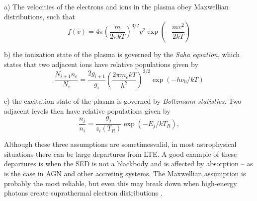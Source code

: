 a) The velocities of the electrons and ions in the plasma obey Maxwellian
distributions, such that
\begin{equation}
f(v) = 4 \pi \left( \frac{m}{2 \pi kT} \right)^{3/2} v^2 
\exp \left( - \frac{mv^2}{2kT} \right)
\label{eq:maxwellian}
\end{equation}

\smallskip

b) the ionization state of the plasma is governed by the {\em Saha equation},
which states that two adjacent ions have relative populations given by
\begin{equation}
\frac{N_{i+1}n_e}{N_i} = \frac{2g_{i+1}}{g_i} 
\left( \frac{2 \pi m_e kT}{h^2} \right)^{3/2}
\exp(-h \nu_0/kT)
\label{eq:saha}
\end{equation}

\smallskip

c) the excitation state of the plasma is governed by {\em Boltzmann statistics}.
Two adjacent levels then have relative populations given by
\begin{equation}
\frac{n_{j}}{n_i} = \frac{g_j}{z_i(T_R)} \exp(-E_j/kT_R), 
\label{eq:boltzmann}
\end{equation}

\smallskip

Although these three assumptions are sometimesvalid, in most astrophysical situations
there can be large departures from LTE. A good example of these departures is when
the SED is not a blackbody and is affected by absorption -- 
as is the case in AGN and other accreting systems. The Maxwellian assumption 
is probably the most reliable, but even this may break down
when high-energy photons create suprathermal electron distributions 
\citep{humphrey2014}. 

